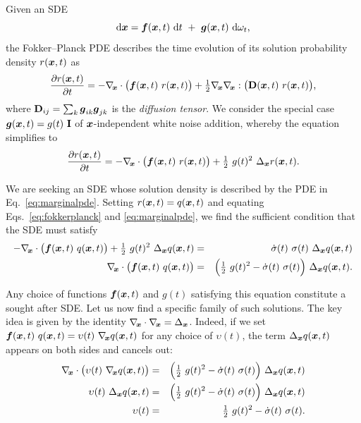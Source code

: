 Given an SDE
\begin{equation}
  \mathrm{d} \boldsymbol{x} = \boldsymbol{f}(\boldsymbol{x}, t) ~ \mathrm{d} t ~ + ~ \boldsymbol{g}(\boldsymbol{x}, t) ~ \mathrm{d}\omega_t
  \label{eq:sdegeneral}
  \text{,}
\end{equation}
the Fokker--Planck PDE describes the time evolution of its solution probability density $r(\boldsymbol{x}, t)$ as
\begin{equation}
  \frac{\partial r(\boldsymbol{x}, t)}{\partial t} = -\nabla_{\hspace{-0.5mm}\boldsymbol{x}} \cdot \big( \boldsymbol{f}(\boldsymbol{x},t) ~r(\boldsymbol{x},t) \big) + \tfrac{1}{2} \nabla_{\hspace{-0.5mm}\boldsymbol{x}} \nabla_{\hspace{-0.5mm}\boldsymbol{x}} : \big( \mathbf{D}(\boldsymbol{x}, t) ~r(\boldsymbol{x}, t) \big)
  \text{,}
\end{equation}
where $\mathbf{D}_{ij} = \sum_k \boldsymbol{g}_{ik} \boldsymbol{g}_{jk}$ is the \emph{diffusion tensor}. %
We consider the special case $\boldsymbol{g}(\boldsymbol{x}, t) = g(t) ~\mathbf{I}$ of $\boldsymbol{x}$-independent white noise addition, whereby the equation simplifies to
\begin{equation}
  \frac{\partial r(\boldsymbol{x}, t)}{\partial t} = -\nabla_{\hspace{-0.5mm}\boldsymbol{x}} \cdot \big( \boldsymbol{f}(\boldsymbol{x},t) ~r(\boldsymbol{x},t) \big) + \tfrac{1}{2} ~g(t)^2 ~{\Delta_{\boldsymbol{x}}} r(\boldsymbol{x}, t)
  \label{eq:fokkerplanck}
  \text{.}
\end{equation}

We are seeking an SDE whose solution density is described by the PDE in Eq.~\ref{eq:marginalpde}. Setting $r(\boldsymbol{x}, t) = q(\boldsymbol{x}, t)$ and equating Eqs.~\ref{eq:fokkerplanck} and \ref{eq:marginalpde}, we find the sufficient condition that the SDE must satisfy
\begin{eqnarray}
  -\nabla_{\hspace{-0.5mm}\boldsymbol{x}} \cdot \big( \boldsymbol{f}(\boldsymbol{x},t) ~q(\boldsymbol{x},t) \big) + \tfrac{1}{2} ~g(t)^2 ~{\Delta_{\boldsymbol{x}}} q(\boldsymbol{x}, t) &=& \dot\sigma(t) ~\sigma(t) ~{\Delta_{\boldsymbol{x}}} q(\boldsymbol{x}, t) \\
  \nabla_{\hspace{-0.5mm}\boldsymbol{x}} \cdot \big( \boldsymbol{f}(\boldsymbol{x},t) ~q(\boldsymbol{x},t) \big) &=& \Big( \tfrac{1}{2} ~g(t)^2 - \dot\sigma(t) ~\sigma(t) \Big) ~{\Delta_{\boldsymbol{x}}} q(\boldsymbol{x}, t)
  \text{.}
\end{eqnarray}

Any choice of functions $\boldsymbol{f}(\boldsymbol{x},t)$ and $g(t)$ satisfying this equation constitute a sought after SDE. Let us now find a specific family of such solutions. The key idea is given by the identity $\nabla_{\hspace{-0.5mm}\boldsymbol{x}} \cdot \nabla_{\hspace{-0.5mm}\boldsymbol{x}} = {\Delta_{\boldsymbol{x}}}$. Indeed, if we set $\boldsymbol{f}(\boldsymbol{x},t) ~q(\boldsymbol{x},t) = \upsilon(t) ~\nabla_{\hspace{-0.5mm}\boldsymbol{x}} q(\boldsymbol{x},t)$ for any choice of $\upsilon(t)$, the term ${\Delta_{\boldsymbol{x}}} q(\boldsymbol{x},t)$ appears on both sides and cancels out:
\begin{eqnarray}
  \nabla_{\hspace{-0.5mm}\boldsymbol{x}} \cdot \big( \upsilon(t) ~\nabla_{\hspace{-0.5mm}\boldsymbol{x}} q(\boldsymbol{x},t) \big) &=& \Big( \tfrac{1}{2} ~g(t)^2 - \dot\sigma(t) ~\sigma(t) \Big) ~{\Delta_{\boldsymbol{x}}} q(\boldsymbol{x}, t) \\
  \upsilon(t) ~{\Delta_{\boldsymbol{x}}} q(\boldsymbol{x},t) &=& \Big( \tfrac{1}{2} ~g(t)^2 - \dot\sigma(t) ~\sigma(t) \Big) ~{\Delta_{\boldsymbol{x}}} q(\boldsymbol{x}, t) \\
  \upsilon(t) &=& \tfrac{1}{2} ~g(t)^2 - \dot\sigma(t) ~\sigma(t)
  \text{.}
\end{eqnarray}


